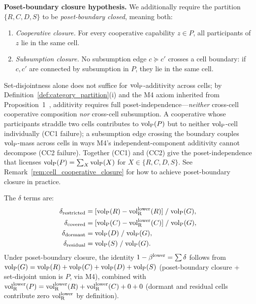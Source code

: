 \begin{definition}
\medskip\noindent
\textbf{Poset-boundary closure hypothesis.}  We additionally
require the partition $\{R, C, D, S\}$ to be
\emph{poset-boundary closed}, meaning both:
\begin{enumerate}
\item[(CC1)] \emph{Cooperative closure.}  For every cooperative
  capability $z \in P$, all participants of $z$ lie in the same
  cell.
\item[(CC2)] \emph{Subsumption closure.}  No subsumption edge
  $c \succeq c'$ crosses a cell boundary: if $c, c'$ are
  connected by subsumption in $P$, they lie in the same cell.
\end{enumerate}
Set-disjointness alone does not suffice for ${\operatorname{vol}_{\mathrm{P}}}$-additivity
across cells; by Definition~\ref{def:category_partition}(i) and
the M4 axiom inherited from
Proposition~1~\citep{lasser2026poset}, additivity requires full
poset-independence---\emph{neither} cross-cell cooperative
composition \emph{nor} cross-cell subsumption.  A cooperative
whose participants straddle two cells contributes to ${\operatorname{vol}_{\mathrm{P}}}(P)$
but to neither ${\operatorname{vol}_{\mathrm{P}}}$-cell individually (CC1 failure);
a subsumption edge crossing the boundary couples ${\operatorname{vol}_{\mathrm{P}}}$-mass
across cells in ways M4's independent-component additivity
cannot decompose (CC2 failure).  Together (CC1) and (CC2) give
the poset-independence that licenses ${\operatorname{vol}_{\mathrm{P}}}(P) = \sum_X
{\operatorname{vol}_{\mathrm{P}}}(X)$ for $X \in \{R, C, D, S\}$.  See
Remark~\ref{rem:cell_cooperative_closure} for how to achieve
poset-boundary closure in practice.

The $\delta$ terms are:
\begin{align*}
  \delta_{\mathrm{restricted}} &= [{\operatorname{vol}_{\mathrm{P}}}(R) -
    {\operatorname{vol}_{\mathrm{R}}^{\mathrm{lower}}}(R)] \;/\; {\operatorname{vol}_{\mathrm{P}}}(G), \\
  \delta_{\mathrm{covered}} &= [{\operatorname{vol}_{\mathrm{P}}}(C) -
    {\operatorname{vol}_{\mathrm{R}}^{\mathrm{lower}}}(C)] \;/\; {\operatorname{vol}_{\mathrm{P}}}(G), \\
  \delta_{\mathrm{dormant}} &= {\operatorname{vol}_{\mathrm{P}}}(D) \;/\; {\operatorname{vol}_{\mathrm{P}}}(G), \\
  \delta_{\mathrm{residual}} &= {\operatorname{vol}_{\mathrm{P}}}(S) \;/\; {\operatorname{vol}_{\mathrm{P}}}(G).
\end{align*}
Under poset-boundary closure, the identity $1 - \beta^{\mathrm{lower}} = \sum
\delta$ follows from ${\operatorname{vol}_{\mathrm{P}}}(G) = {\operatorname{vol}_{\mathrm{P}}}(R) + {\operatorname{vol}_{\mathrm{P}}}(C) + {\operatorname{vol}_{\mathrm{P}}}(D)
+ {\operatorname{vol}_{\mathrm{P}}}(S)$ (poset-boundary closure + set-disjoint union is $P$,
via M4), combined with ${\operatorname{vol}_{\mathrm{R}}^{\mathrm{lower}}}(P) = {\operatorname{vol}_{\mathrm{R}}^{\mathrm{lower}}}(R) +
{\operatorname{vol}_{\mathrm{R}}^{\mathrm{lower}}}(C) + 0 + 0$ (dormant and residual cells contribute
zero ${\operatorname{vol}_{\mathrm{R}}^{\mathrm{lower}}}$ by definition).
\end{definition}

